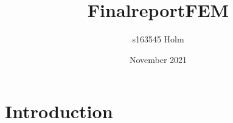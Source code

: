\documentclass{article}
\title{FinalreportFEM}
\author{s163545 Holm}
\date{November 2021}
\begin{document}
\maketitle

\section{Introduction}
\end{document}
